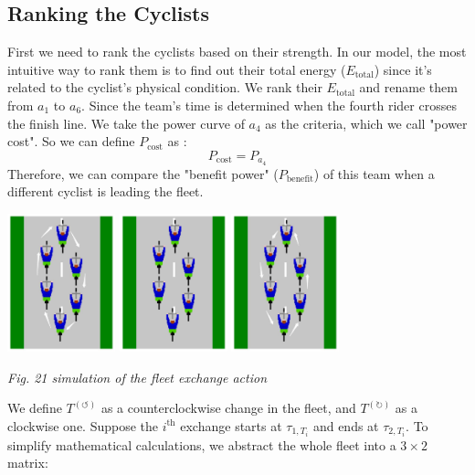 \documentclass{article}
\begin{document}
		\subsection{Ranking the Cyclists}
			First we need to rank the cyclists based on their strength. In our model, the most intuitive way to rank them is to find out their total energy ($E_\mathrm{total}$) since it's related to the cyclist's physical condition. We rank their $E_\mathrm{total}$ and rename them from $a_1$ to $a_6$. Since the team's time is determined when the fourth rider crosses the finish line. We take the power curve of $a_4$ as the criteria, which we call "power cost". So we can define $P_\mathrm{cost}$ as :
			$$P_\mathrm{cost}=P_{a_4}$$
			Therefore, we can compare the "benefit power" ($P_\mathrm{benefit}$) of this team when a different cyclist is leading the fleet.
			\begin{center}
				\includegraphics[height = 4cm]{clockwise.jpg}
				\includegraphics[height = 4cm]{fleet actions.png}
				\includegraphics[height = 4cm]{counterclockwise.jpg}

				\small\textit{Fig. 21 simulation of the fleet exchange action}
			\end{center}
				We define \(T^{\left( \circlearrowleft \right)}\) as a counterclockwise change in the fleet, and \(T^{\left( \circlearrowright \right)}\) as a clockwise one. Suppose the \(i^{\mathrm{th}}\) exchange starts at \(\tau_{1,T_i}\) and ends at \(\tau_{2,T_i}\). To simplify mathematical calculations, we abstract the whole fleet into a \(3\times 2\) matrix:
\end{document}
